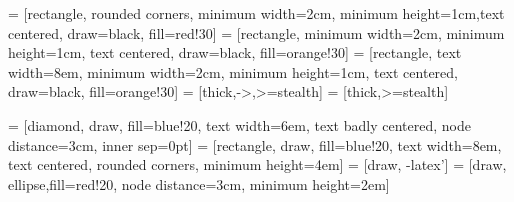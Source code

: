  = [rectangle, rounded corners, minimum width=2cm, minimum height=1cm,text centered, draw=black, fill=red!30]
 = [rectangle, minimum width=2cm, minimum height=1cm, text centered, draw=black, fill=orange!30]
 = [rectangle, text width=8em, minimum width=2cm, minimum height=1cm, text centered, draw=black, fill=orange!30]
 = [thick,->,>=stealth]
 = [thick,>=stealth]

 = [diamond, draw, fill=blue!20, 
    text width=6em, text badly centered, node distance=3cm, inner sep=0pt]
 = [rectangle, draw, fill=blue!20, 
    text width=8em, text centered, rounded corners, minimum height=4em]
 = [draw, -latex']
 = [draw, ellipse,fill=red!20, node distance=3cm,
    minimum height=2em]
